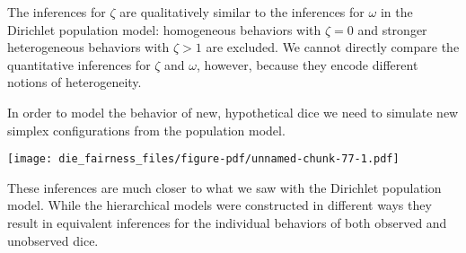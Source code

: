 \documentclass[
  letterpaper,
  DIV=11,
  numbers=noendperiod]{scrartcl}
\newenvironment{Shaded}{\begin{snugshade}}{\end{snugshade}}
\newcommand{\AttributeTok}[1]{\textcolor[rgb]{0.40,0.45,0.13}{#1}}
\newcommand{\ControlFlowTok}[1]{\textcolor[rgb]{0.00,0.23,0.31}{#1}}
\newcommand{\DecValTok}[1]{\textcolor[rgb]{0.68,0.00,0.00}{#1}}
\newcommand{\FloatTok}[1]{\textcolor[rgb]{0.68,0.00,0.00}{#1}}
\newcommand{\FunctionTok}[1]{\textcolor[rgb]{0.28,0.35,0.67}{#1}}
\newcommand{\NormalTok}[1]{\textcolor[rgb]{0.00,0.23,0.31}{#1}}
\newcommand{\OtherTok}[1]{\textcolor[rgb]{0.00,0.23,0.31}{#1}}
\newcommand{\SpecialCharTok}[1]{\textcolor[rgb]{0.37,0.37,0.37}{#1}}
\newcommand{\StringTok}[1]{\textcolor[rgb]{0.13,0.47,0.30}{#1}}
\begin{document}
The inferences for \(\zeta\) are qualitatively similar to the inferences
for \(\omega\) in the Dirichlet population model: homogeneous behaviors
with \(\zeta = 0\) and stronger heterogeneous behaviors with
\(\zeta > 1\) are excluded. We cannot directly compare the quantitative
inferences for \(\zeta\) and \(\omega\), however, because they encode
different notions of heterogeneity.

In order to model the behavior of new, hypothetical dice we need to
simulate new simplex configurations from the population model.

\begin{Shaded}
\end{Shaded}

\texttt{[image: die\_fairness\_files/figure-pdf/unnamed-chunk-77-1.pdf]}

These inferences are much closer to what we saw with the Dirichlet
population model. While the hierarchical models were constructed in
different ways they result in equivalent inferences for the individual
behaviors of both observed and unobserved dice.
\end{document}
